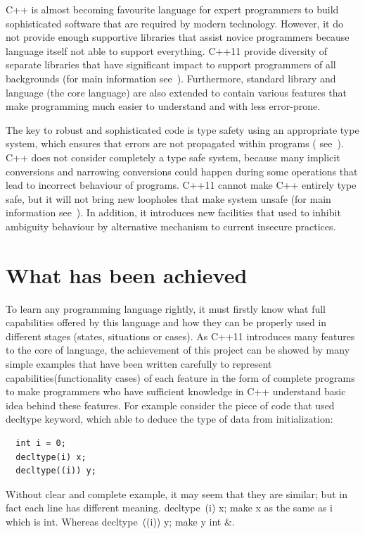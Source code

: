 \documentclass[11pt]{report}
\begin{document}
C++ is almost becoming favourite language for expert programmers to build sophisticated software that are required by modern technology. However, it do not provide enough supportive libraries that assist novice programmers because language itself not able to support everything. C++11 provide diversity of separate libraries that have significant impact to support programmers of all backgrounds (for main information see~\cite{Stroustrup:2005:Design}). Furthermore, standard library and language (the core language) are also extended to contain various features that make programming much easier to understand and with less error-prone.

The key to robust and sophisticated code is type safety using an appropriate type system, which ensures that errors are not propagated within programs ( see~\cite{Stroustrup:2005:Cpp}). C++ does not consider completely a type safe system, because many implicit conversions and narrowing conversions could happen during some operations that lead to incorrect behaviour of programs. C++11 cannot make C++ entirely type safe, but it will not bring new loopholes that make system unsafe (for main information see~\cite{Stroustrup:2005:Cpp}). In addition, it introduces new facilities that used to inhibit ambiguity behaviour by alternative mechanism to current insecure practices.


\section{What has been achieved}
\label{what has been achieved}
To learn any programming language rightly, it must firstly know what full capabilities offered by this language and how they can be properly used in different stages (states, situations or cases). As C++11 introduces many features to the core of language, the achievement of this project can be showed by many simple examples that have been written carefully to represent capabilities(functionality cases) of each feature in the form of complete programs to make programmers who have sufficient knowledge in C++ understand basic idea behind these features. For example consider the piece of code that used decltype keyword, which able to deduce the type of data from initialization:
\begin{lstlisting}
  int i = 0;
  decltype(i) x;
  decltype((i)) y;
\end{lstlisting}
Without clear and complete example, it may seem that they are similar; but in fact each line has different meaning. decltype~(i) x; make x as the same as i which is int. Whereas decltype~((i)) y; make y int \&.
\end{document}
